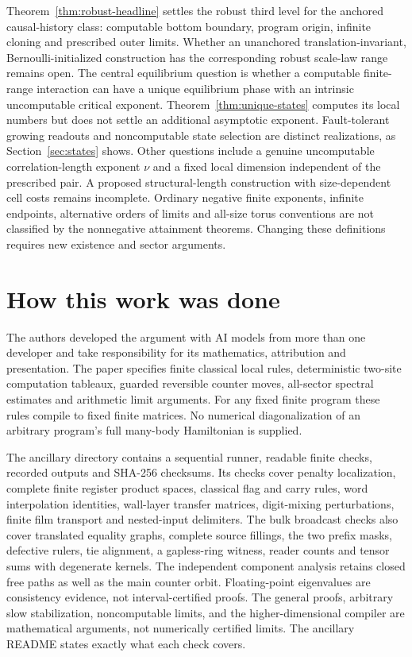 Theorem~\ref{thm:robust-headline} settles the robust third level
for the anchored causal-history class: computable bottom boundary,
program origin, infinite cloning and prescribed outer limits.
Whether an unanchored translation-invariant, Bernoulli-initialized
construction has the corresponding robust scale-law range remains open.
The central equilibrium question is whether a computable finite-range
interaction can have a unique equilibrium phase with an intrinsic
uncomputable critical exponent. Theorem~\ref{thm:unique-states}
computes its local numbers but does not settle an additional asymptotic
exponent. Fault-tolerant growing readouts and noncomputable state selection
are distinct realizations, as Section~\ref{sec:states} shows.
Other questions include a genuine uncomputable correlation-length
exponent $\nu$ and a fixed local dimension independent of the
prescribed pair. A proposed structural-length construction with
size-dependent cell costs remains incomplete. Ordinary negative
finite exponents, infinite endpoints, alternative orders of limits
and all-size torus conventions are not classified by the nonnegative
attainment theorems. Changing these definitions requires new
existence and sector arguments.

\section*{How this work was done}
The authors developed the argument with AI models from more than one
developer and take responsibility for its mathematics, attribution
and presentation. The paper specifies finite classical local rules,
deterministic two-site computation tableaux, guarded reversible
counter moves, all-sector spectral estimates and arithmetic limit
arguments. For any fixed finite program these rules compile to
fixed finite matrices. No numerical diagonalization of an arbitrary
program's full many-body Hamiltonian is supplied.

The ancillary directory contains a sequential runner, readable finite
checks, recorded outputs and SHA-256 checksums. Its checks cover
penalty localization, complete finite register product spaces,
classical flag and carry rules, word interpolation identities,
wall-layer transfer matrices, digit-mixing perturbations, finite
film transport and nested-input delimiters. The bulk broadcast checks
also cover translated equality graphs, complete source fillings, the two
prefix masks, defective rulers, tie alignment, a gapless-ring witness,
reader counts and tensor sums with degenerate kernels. The independent
component analysis retains closed free paths as well as the main
counter orbit. Floating-point eigenvalues are consistency evidence,
not interval-certified proofs. The general proofs, arbitrary slow
stabilization, noncomputable limits, and the higher-dimensional
compiler are mathematical arguments, not numerically certified
limits. The ancillary README states exactly what each check covers.

